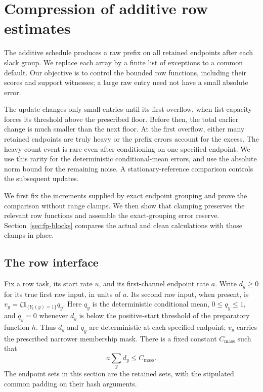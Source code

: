 \section{Compression of additive row estimates}
\label{sec:buf-compression}

The additive schedule produces a raw prefix on all retained endpoints after
each slack group.  We replace each array by a finite list of exceptions to
a common default.  Our objective is to control the bounded row functions,
including their scores and support witnesses; a large raw entry need not
have a small absolute error.

The update changes only small entries until its first overflow, when list
capacity forces its threshold above the prescribed floor.  Before then,
the total earlier change is much smaller than the next floor.  At the
first overflow, either many retained endpoints are truly heavy or the
prefix errors account for the excess.  The heavy-count event is rare even
after conditioning on one specified endpoint.  We use this rarity for the
deterministic conditional-mean errors, and use the absolute norm bound for
the remaining noise.  A stationary-reference comparison controls the
subsequent updates.

We first fix the increments supplied by exact endpoint grouping and prove
the comparison without range clamps.  We then show that clamping preserves
the relevant row functions and assemble the exact-grouping error reserve.
Section~\ref{sec:fp-blocks} compares the actual and clean calculations with
those clamps in place.

\subsection{The row interface}
\label{subsec:buf-interface}
Fix a row task, its start rate $u$, and its first-channel endpoint rate $a$.
Write $d_y\geq0$ for its true first raw input, in units of $a$.  Its second
raw input, when present, is $v_y=\zeta\mathbf1_{\{Y_t(y)=1\}}q_y$.
Here $q_y$ is the deterministic conditional mean, $0\leq q_y\leq1$, and
$q_y=0$ whenever $d_y$ is below the positive-start threshold of the
preparatory function $h$.  Thus $d_y$ and $q_y$ are deterministic at each
specified endpoint; $v_y$ carries the prescribed narrower membership mask.
There is a fixed constant $C_{\mathrm{mass}}$ such that
\begin{equation}
 a\sum_y d_y\leq C_{\mathrm{mass}}.
 \label{eq:buf-mass}
\end{equation}
The endpoint sets in this section are the retained sets, with the stipulated
common padding on their hash arguments.

